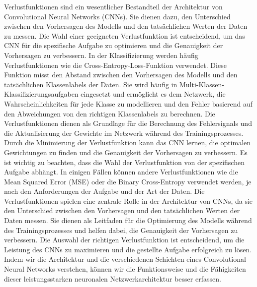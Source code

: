     Verlustfunktionen sind ein wesentlicher Bestandteil der Architektur von Convolutional Neural Networks (CNNs). 
    Sie dienen dazu, den Unterschied zwischen den Vorhersagen des Modells und den tatsächlichen Werten der Daten zu messen. 
    Die Wahl einer geeigneten Verlustfunktion ist entscheidend, um das CNN für die spezifische Aufgabe zu optimieren und die Genauigkeit der Vorhersagen zu verbessern.
    In der Klassifizierung werden häufig Verlustfunktionen wie die Cross-Entropy-Loss-Funktion verwendet. 
    Diese Funktion misst den Abstand zwischen den Vorhersagen des Modells und den tatsächlichen Klassenlabels der Daten. Sie wird häufig in Multi-Klassen-Klassifizierungsaufgaben eingesetzt und ermöglicht es dem Netzwerk, die Wahrscheinlichkeiten für jede Klasse zu modellieren und den Fehler basierend auf den Abweichungen von den richtigen Klassenlabels zu berechnen.
    Die Verlustfunktionen dienen als Grundlage für die Berechnung des Fehlersignals und die Aktualisierung der Gewichte im Netzwerk während des Trainingsprozesses. Durch die Minimierung der Verlustfunktion kann das CNN lernen, die optimalen Gewichtungen zu finden und die Genauigkeit der Vorhersagen zu verbessern.
    Es ist wichtig zu beachten, dass die Wahl der Verlustfunktion von der spezifischen Aufgabe abhängt. 
    In einigen Fällen können andere Verlustfunktionen wie die Mean Squared Error (MSE) oder die Binary Cross-Entropy verwendet werden, je nach den Anforderungen der Aufgabe und der Art der Daten.
    Die Verlustfunktionen spielen eine zentrale Rolle in der Architektur von CNNs, da sie den Unterschied zwischen den Vorhersagen und den tatsächlichen Werten der Daten messen. 
    Sie dienen als Leitfaden für die Optimierung des Modells während des Trainingsprozesses und helfen dabei, die Genauigkeit der Vorhersagen zu verbessern. 
    Die Auswahl der richtigen Verlustfunktion ist entscheidend, um die Leistung des CNNs zu maximieren und die gestellte Aufgabe erfolgreich zu lösen.
    Indem wir die Architektur und die verschiedenen Schichten eines Convolutional Neural Networks verstehen, können wir die Funktionsweise und die Fähigkeiten dieser leistungsstarken neuronalen Netzwerkarchitektur besser erfassen. 






